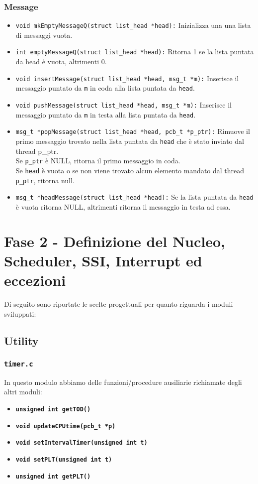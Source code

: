 \documentclass{article}
\begin{document}
\subsubsection{Message}
\begin{itemize}
    \item \texttt{void mkEmptyMessageQ(struct list\_head *head):}  Inizializza una una lista di messaggi vuota.
    \item \texttt{int emptyMessageQ(struct list\_head *head):} Ritorna 1 se la lista puntata da head è vuota, altrimenti 0.
    
    \item \texttt{void insertMessage(struct list\_head *head, msg\_t *m):} Inserisce il messaggio puntato da \texttt{m} in coda alla lista puntata da \texttt{head}.
    \item \texttt{void pushMessage(struct list\_head *head, msg\_t *m):} Inserisce il messaggio puntato da \texttt{m} in testa alla lista puntata da \texttt{head}.
    \item \texttt{msg\_t *popMessage(struct list\_head *head, pcb\_t *p\_ptr):} Rimuove il primo messaggio trovato nella lista puntata da \texttt{head} che è stato inviato dal thread p\_ptr.\\
    Se \texttt{p\_ptr} è NULL, ritorna il primo messaggio in coda. \\
    Se \texttt{head} è vuota o se non viene trovato alcun elemento mandato dal thread \texttt{p\_ptr}, ritorna null.
    \item \texttt{msg\_t *headMessage(struct list\_head *head):} Se la lista puntata da \texttt{head} è vuota ritorna NULL, altrimenti ritorna il messaggio in testa ad essa.
\end{itemize}

\newpage

\section{Fase 2 - Definizione del Nucleo, Scheduler, SSI, Interrupt ed eccezioni}
Di seguito sono riportate le scelte progettuali per quanto riguarda i moduli sviluppati:

\subsection{Utility}
\subsubsection{\texttt{\textbf{timer.c}}}
In questo modulo abbiamo delle funzioni/procedure ausiliarie richiamate degli altri moduli:
\begin{itemize}
    \item \texttt{\textbf{unsigned int getTOD()}}
    \item \texttt{\textbf{void updateCPUtime(pcb\_t *p)}}
    \item \texttt{\textbf{void setIntervalTimer(unsigned int t)}}
    \item \texttt{\textbf{void setPLT(unsigned int t)}}
    \item \texttt{\textbf{unsigned int getPLT()}}
\end{itemize}
\end{document}
